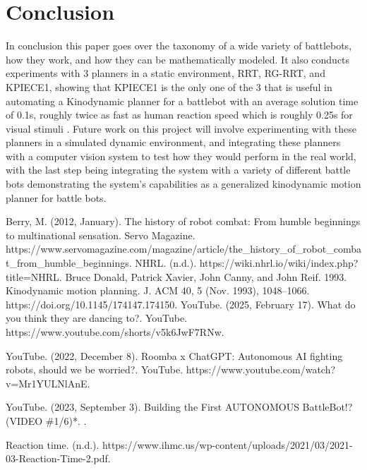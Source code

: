 \documentclass[conference]{IEEEtran}
\begin{document}
\section{Conclusion}
In conclusion this paper goes over the taxonomy of a wide variety of battlebots, how they work, and how they can be mathematically modeled.  It also conducts experiments with 3 planners in a static environment, RRT, RG-RRT, and KPIECE1, showing that KPIECE1 is the only one of the 3 that is useful in automating a Kinodynamic planner for a battlebot with an average solution time of 0.1s, roughly twice as fast as human reaction speed which is roughly 0.25s for visual stimuli \cite{b7}.  Future work on this project will involve experimenting with these planners in a simulated dynamic environment, and integrating these planners with a computer vision system to test how they would perform in the real world, with the last step being integrating the system with a variety of different battle bots demonstrating the system's capabilities as a generalized kinodynamic motion planner for battle bots.
\begin{thebibliography}{00}
 Berry, M. (2012, January). The history of robot combat: From humble beginnings to multinational sensation. Servo Magazine. https://www.servomagazine.com/magazine/article/the\_history\_of\_robot\_combat\_from\_humble\_beginnings.
 NHRL. (n.d.). https://wiki.nhrl.io/wiki/index.php?title=NHRL.
 Bruce Donald, Patrick Xavier, John Canny, and John Reif. 1993. Kinodynamic motion planning. J. ACM 40, 5 (Nov. 1993), 1048–1066. https://doi.org/10.1145/174147.174150.
 YouTube. (2025, February 17). What do you think they are dancing to?. YouTube. https://www.youtube.com/shorts/v5k6JwF7RNw.


 YouTube. (2022, December 8). Roomba x ChatGPT: Autonomous AI fighting robots, should we be worried?. YouTube. https://www.youtube.com/watch?v=Mr1YULNlAnE.


 YouTube. (2023, September 3). Building the First AUTONOMOUS BattleBot!? (VIDEO \#1/6)*. .

 Reaction time. (n.d.). https://www.ihmc.us/wp-content/uploads/2021/03/2021-03-Reaction-Time-2.pdf.




\end{thebibliography}

\vspace{12pt}
\end{document}
